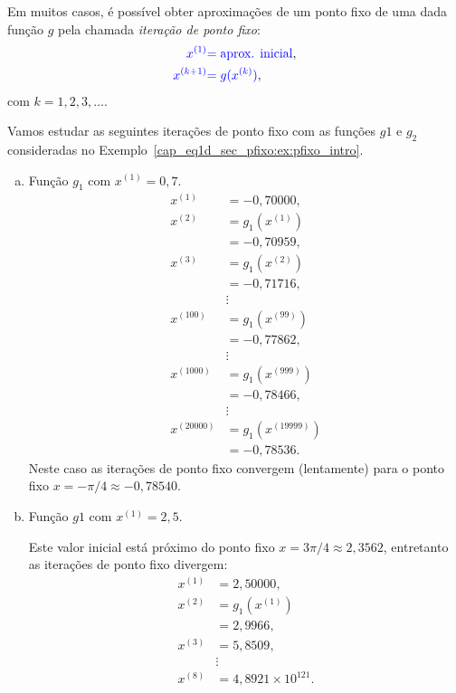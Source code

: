 Em muitos casos, é possível obter aproximações de um ponto fixo de uma dada função $g$ pela chamada \emph{iteração de ponto fixo}:
\begin{align}
  {\color{blue}x^{(1)}} &{\color{blue}= \text{aprox. inicial}},\\
  {\color{blue}x^{(k+1)}} &{\color{blue}= g(x^{(k)})},
\end{align}
com $k=1,2,3,\ldots$.

\begin{ex}
  Vamos estudar as seguintes iterações de ponto fixo com as funções $g1$ e $g_2$ consideradas no Exemplo~\ref{cap_eq1d_sec_pfixo:ex:pfixo_intro}.
  \begin{enumerate}[a)]
  \item Função $g_1$ com $x^{(1)} = 0,7$.
    \begin{align}
      x^{(1)} &= -0,70000,\\
      x^{(2)} &= g_1\left(x^{(1)}\right)\\
              &= -0,70959,\\
      x^{(3)} &= g_1\left(x^{(2)}\right)\\
              &=-0,71716,\\
              &\vdots \nonumber\\
      x^{(100)} &= g_1\left(x^{(99)}\right)\\
              &= -0,77862,\\
              &\vdots \nonumber\\
      x^{(1000)} &= g_1\left(x^{(999)}\right)\\
              &= -0,78466,\\    
              &\vdots \nonumber\\
      x^{(20000)} &= g_1\left(x^{(19999)}\right)\\
              &= -0,78536.
    \end{align}
    Neste caso as iterações de ponto fixo convergem (lentamente) para o ponto fixo $x=-\pi/4\approx -0,78540$.

  \item Função $g1$ com $x^{(1)} = 2,5$.
    
    Este valor inicial está próximo do ponto fixo $x=3\pi/4\approx 2,3562$, entretanto as iterações de ponto fixo divergem:
    \begin{align}
      x^{(1)} &= 2,50000,\\
      x^{(2)} &= g_1\left(x^{(1)}\right)\\
              &= 2,9966,\\
      x^{(3)} &= 5,8509,\\
              &\vdots \nonumber\\
      x^{(8)} &= 4,8921\times 10^{121}.
    \end{align}
    

\end{enumerate}
\end{ex}
